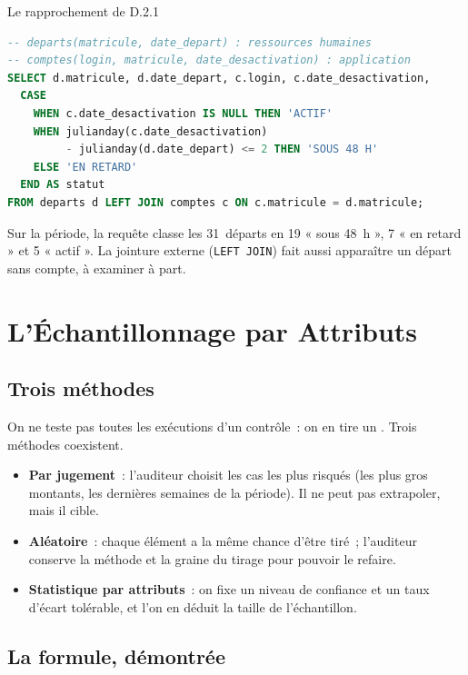 \begin{boxoutils}{Le rapprochement de D.2.1}
\begin{lstlisting}[language=SQL]
-- departs(matricule, date_depart) : ressources humaines
-- comptes(login, matricule, date_desactivation) : application
SELECT d.matricule, d.date_depart, c.login, c.date_desactivation,
  CASE
    WHEN c.date_desactivation IS NULL THEN 'ACTIF'
    WHEN julianday(c.date_desactivation)
         - julianday(d.date_depart) <= 2 THEN 'SOUS 48 H'
    ELSE 'EN RETARD'
  END AS statut
FROM departs d LEFT JOIN comptes c ON c.matricule = d.matricule;
\end{lstlisting}
Sur la période, la requête classe les 31~départs en 19 « sous 48~h »,
7 « en retard » et 5 « actif ». La jointure externe (\texttt{LEFT JOIN})
fait aussi apparaître un départ sans compte, à examiner à part.
\end{boxoutils}

\section{L'Échantillonnage par Attributs}
\label{sec:c10-attributs}

\subsection{Trois méthodes}

On ne teste pas toutes les exécutions d'un contrôle~: on en tire un
. Trois méthodes coexistent.
\begin{itemize}
    \item \textbf{Par jugement}~: l'auditeur choisit les cas les plus risqués
          (les plus gros montants, les dernières semaines de la période). Il
          ne peut pas extrapoler, mais il cible.
    \item \textbf{Aléatoire}~: chaque élément a la même chance d'être tiré~;
          l'auditeur conserve la méthode et la graine du tirage pour pouvoir
          le refaire.
    \item \textbf{Statistique par attributs}~: on fixe un niveau de confiance
          et un taux d'écart tolérable, et l'on en déduit la taille de
          l'échantillon.
\end{itemize}

\subsection{La formule, démontrée}

